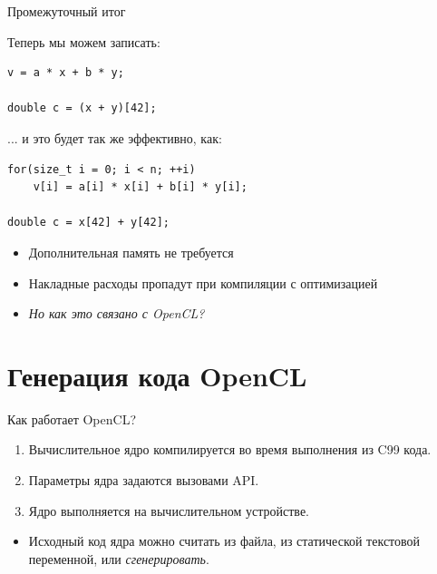 \documentclass[@BEAMER_OPTIONS@]{beamer}
\newcommand{\CC}{{\rm C99}\xspace}
\begin{document}
\begin{frame}[fragile]{Промежуточный итог}
    \begin{exampleblock}{Теперь мы можем записать:}
        \begin{lstlisting}
v = a * x + b * y;

double c = (x + y)[42];
        \end{lstlisting}
    \end{exampleblock}

    \begin{exampleblock}{... и это будет так же эффективно, как:}
        \begin{lstlisting}
for(size_t i = 0; i < n; ++i)
    v[i] = a[i] * x[i] + b[i] * y[i];

double c = x[42] + y[42];
        \end{lstlisting}
    \end{exampleblock}
    \begin{itemize}
        \item Дополнительная память не требуется
        \item Накладные расходы пропадут при компиляции с оптимизацией
            \vspace{\baselineskip}
            \pause
        \item<alert@2> \emph{Но как это связано с OpenCL?}
    \end{itemize}
\end{frame}


\section{Генерация кода OpenCL}
\begin{frame}
    \sectionpage
\end{frame}

\note{ }

\begin{frame}{Как работает OpenCL?}
    \begin{enumerate}
        \item Вычислительное ядро компилируется во время выполнения из \CC
            кода.
        \item Параметры ядра задаются вызовами API.
        \item Ядро выполняется на вычислительном устройстве.
    \end{enumerate}
    \vspace{\baselineskip}
    \pause
    \begin{itemize}
        \item Исходный код ядра можно считать из файла, из статической
            текстовой переменной, или \alert{\emph{сгенерировать}}.
    \end{itemize}
\end{frame}
\end{document}
